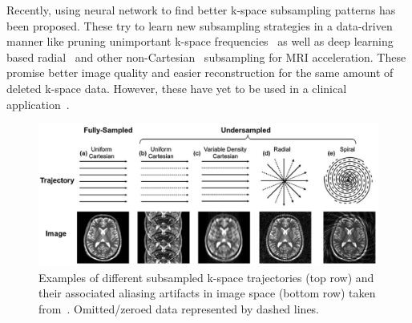 Recently, using neural network to find better k-space subsampling patterns has been proposed. These try to learn new subsampling strategies in a data-driven manner like pruning unimportant k-space frequencies~\cite{MRISubsamplingPruning} as well as deep learning based radial~\cite{DeepMRIReconstructionRadialSubsampling} and other non-Cartesian~\cite{DeepMRIReconstructionSubsampling} subsampling for MRI acceleration. These promise better image quality and easier reconstruction for the same amount of deleted k-space data. However, these have yet to be used in a clinical application~\cite{MRISubsamplingPruning}.

\begin{figure}[h] %
	\centering
	\graphicspath{{images/}{\main/images/}}
	\includegraphics[width=\linewidth]{ExamplesSubsampling.png} 
	\caption{Examples of different subsampled k-space trajectories (top row) and their associated aliasing artifacts in image space (bottom row) taken from~\cite{AdvancesPI}. Omitted/zeroed data represented by dashed lines.}
	\label{fig:ExamplesSubsampling}
\end{figure}

